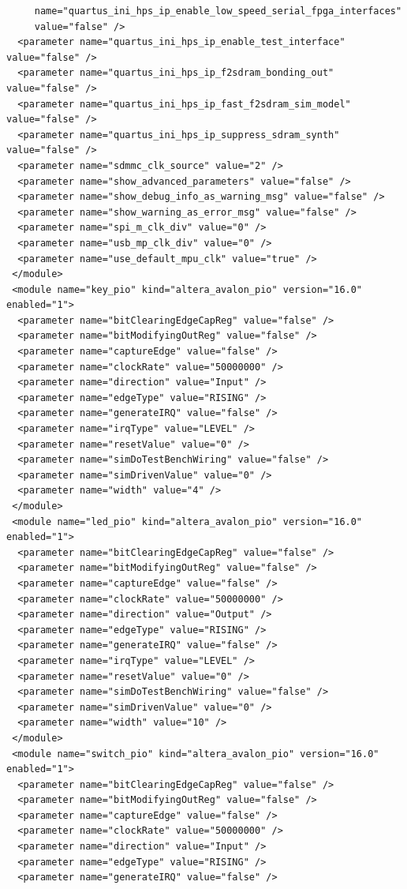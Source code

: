 \documentclass[conference]{IEEEtran}
\begin{document}
\begin{lstlisting}
     name="quartus_ini_hps_ip_enable_low_speed_serial_fpga_interfaces"
     value="false" />
  <parameter name="quartus_ini_hps_ip_enable_test_interface" value="false" />
  <parameter name="quartus_ini_hps_ip_f2sdram_bonding_out" value="false" />
  <parameter name="quartus_ini_hps_ip_fast_f2sdram_sim_model" value="false" />
  <parameter name="quartus_ini_hps_ip_suppress_sdram_synth" value="false" />
  <parameter name="sdmmc_clk_source" value="2" />
  <parameter name="show_advanced_parameters" value="false" />
  <parameter name="show_debug_info_as_warning_msg" value="false" />
  <parameter name="show_warning_as_error_msg" value="false" />
  <parameter name="spi_m_clk_div" value="0" />
  <parameter name="usb_mp_clk_div" value="0" />
  <parameter name="use_default_mpu_clk" value="true" />
 </module>
 <module name="key_pio" kind="altera_avalon_pio" version="16.0" enabled="1">
  <parameter name="bitClearingEdgeCapReg" value="false" />
  <parameter name="bitModifyingOutReg" value="false" />
  <parameter name="captureEdge" value="false" />
  <parameter name="clockRate" value="50000000" />
  <parameter name="direction" value="Input" />
  <parameter name="edgeType" value="RISING" />
  <parameter name="generateIRQ" value="false" />
  <parameter name="irqType" value="LEVEL" />
  <parameter name="resetValue" value="0" />
  <parameter name="simDoTestBenchWiring" value="false" />
  <parameter name="simDrivenValue" value="0" />
  <parameter name="width" value="4" />
 </module>
 <module name="led_pio" kind="altera_avalon_pio" version="16.0" enabled="1">
  <parameter name="bitClearingEdgeCapReg" value="false" />
  <parameter name="bitModifyingOutReg" value="false" />
  <parameter name="captureEdge" value="false" />
  <parameter name="clockRate" value="50000000" />
  <parameter name="direction" value="Output" />
  <parameter name="edgeType" value="RISING" />
  <parameter name="generateIRQ" value="false" />
  <parameter name="irqType" value="LEVEL" />
  <parameter name="resetValue" value="0" />
  <parameter name="simDoTestBenchWiring" value="false" />
  <parameter name="simDrivenValue" value="0" />
  <parameter name="width" value="10" />
 </module>
 <module name="switch_pio" kind="altera_avalon_pio" version="16.0" enabled="1">
  <parameter name="bitClearingEdgeCapReg" value="false" />
  <parameter name="bitModifyingOutReg" value="false" />
  <parameter name="captureEdge" value="false" />
  <parameter name="clockRate" value="50000000" />
  <parameter name="direction" value="Input" />
  <parameter name="edgeType" value="RISING" />
  <parameter name="generateIRQ" value="false" />

\end{lstlisting}
\end{document}
